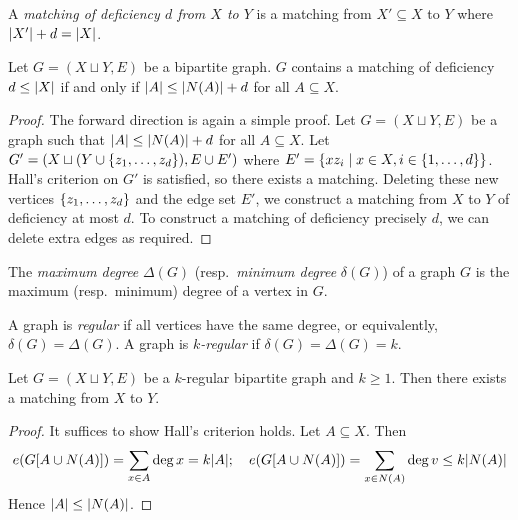 \begin{definition}
	A \emph{matching of deficiency \( d \) from \( X \) to \( Y \)} is a matching from \( X' \subseteq X \) to \( Y \) where \( \abs{X'} + d = \abs{X} \).
\end{definition}
\begin{theorem}
	Let \( G = (X \sqcup Y, E) \) be a bipartite graph.
	\( G \) contains a matching of deficiency \( d \leq \abs{X} \) if and only if \( \abs{A} \leq \abs{N(A)} + d \) for all \( A \subseteq X \).
\end{theorem}
\begin{proof}
	The forward direction is again a simple proof.
	Let \( G = (X \sqcup Y, E) \) be a graph such that \( \abs{A} \leq \abs{N(A)} + d \) for all \( A \subseteq X \).
	Let \( G' = (X \sqcup (Y \cup \qty{z_1, \dots, z_d}), E \cup E') \) where \( E' = \qty{xz_i \mid x \in X, i \in \qty{1, \dots, d}} \).
	Hall's criterion on \( G' \) is satisfied, so there exists a matching.
	Deleting these new vertices \( \qty{z_1, \dots, z_d} \) and the edge set \( E' \), we construct a matching from \( X \) to \( Y \) of deficiency at most \( d \).
	To construct a matching of deficiency precisely \( d \), we can delete extra edges as required.
\end{proof}
\begin{definition}
	The \emph{maximum degree} \( \Delta(G) \) (resp.\ \emph{minimum degree} \( \delta(G) \)) of a graph \( G \) is the maximum (resp.\ minimum) degree of a vertex in \( G \).
\end{definition}
\begin{definition}
	A graph is \emph{regular} if all vertices have the same degree, or equivalently, \( \delta(G) = \Delta(G) \).
	A graph is \emph{\( k \)-regular} if \( \delta(G) = \Delta(G) = k \).
\end{definition}
\begin{corollary}
	Let \( G = (X \sqcup Y, E) \) be a \( k \)-regular bipartite graph and \( k \geq 1 \).
	Then there exists a matching from \( X \) to \( Y \).
\end{corollary}
\begin{proof}
	It suffices to show Hall's criterion holds.
	Let \( A \subseteq X \).
	Then
	\[ e(G[A \cup N(A)]) = \sum_{x \in A} \deg x = k \abs{A};\quad e(G[A \cup N(A)]) = \sum_{x \in N(A)} \deg v \leq k \abs{N(A)} \]
	Hence \( \abs{A} \leq \abs{N(A)} \).
\end{proof}
